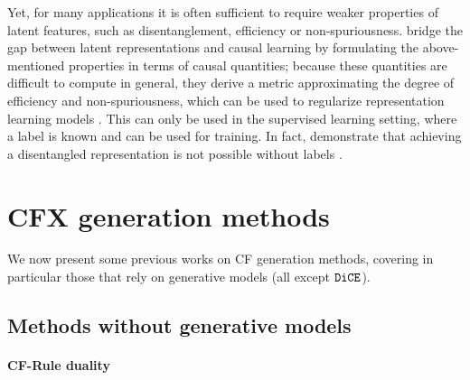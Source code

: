 \documentclass[../main.tex]{subfiles}
\begin{document}
Yet, for many applications it is often sufficient to require weaker properties of latent features, such as disentanglement, efficiency or non-spuriousness.
\citeauthor{wangRepresentation2022} bridge the gap between latent representations and causal learning by formulating the above-mentioned properties in terms of causal quantities; because these quantities are difficult to compute in general, they derive a metric approximating the degree of efficiency and non-spuriousness, which can be used to regularize representation learning models \cite{wangRepresentation2022}.
This can only be used in the supervised learning setting, where a label is known and can be used for training.
In fact, \citeauthor{locatelloChallenging2019} demonstrate that achieving a disentangled representation is not possible without labels \cite{locatelloChallenging2019}.

\section{CFX generation methods}

We now present some previous works on CF generation methods, covering in particular those that rely on generative models (all except $\texttt{DiCE}$).




\subsection{Methods without generative models}

\paragraph{CF-Rule duality}
\end{document}
